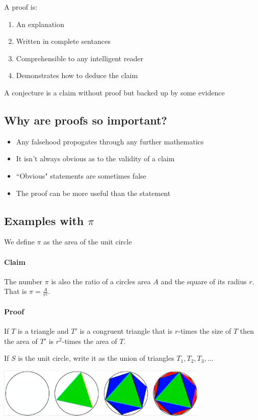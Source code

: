 \documentclass{article}
\begin{document}
A proof is:

\begin{enumerate}
\item An explanation
\item Written in complete sentances
\item Comprehensible to any intelligent reader
\item Demonstrates how to deduce the claim
\end{enumerate}

A conjecture is a claim without proof but backed up by some evidence

\subsection*{Why are proofs so important?}

\begin{itemize}
\item Any falsehood propogates through any further mathematics
\item It isn't always obvious as to the validity of a claim
\item ``Obvious" statements are sometimes false
\item The proof can be more useful than the statement
\end{itemize}

\subsection*{Examples with \(\pi\)}

We define \(\pi\) as the area of the unit circle

\paragraph{Claim} The number \(\pi\) is also the ratio of a circles area \(A\) and the square of its radius \(r\). That is \(\pi=\frac{A}{r^2}\).

\paragraph{Proof} If \(T\) is a triangle and \(T'\) is a congruent triangle that is \(r\)-times the size of \(T\) then the area of \(T'\) is \(r^2\)-times the area of \(T\).

If \(S\) is the unit circle, write it as the union of triangles \(T_1,T_2,T_3,...\)

\begin{center}
\includegraphics[scale=0.8]{CircleArea}
\end{center}
\end{document}
